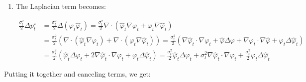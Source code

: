 \documentclass{article}
\begin{document}
\begin{enumerate}
\begin{small}
\begin{align}
    \end{align}
    \end{small}
    \item The Laplacian term becomes:
    \begin{small}
    \begin{align}
        \frac{\sigma_t^2}{2} \Delta p_t^\star&=\frac{\sigma_t^2}{2} \Delta (\varphi_t\hat{\varphi}_t)=\frac{\sigma_t^2}{2}\nabla\cdot (\hat{\varphi}_t\nabla \varphi_t+\varphi_t\nabla \hat{\varphi}_t)\nonumber\\
        &=\frac{\sigma_t^2}{2}(\nabla \cdot (\hat{\varphi}_t\nabla \varphi_t)+\nabla\cdot(\varphi_t\nabla \hat{\varphi}_t))=\frac{\sigma_t^2}{2}(\nabla \hat{\varphi}_t\cdot \nabla \varphi_t+\hat{\varphi}\Delta\varphi+\nabla \varphi_t\cdot\nabla \hat{\varphi}+\varphi_t\Delta\hat{\varphi}_t)\nonumber\\
        &=\frac{\sigma_t^2}{2} (\hat{\varphi}_t\Delta\varphi_t+2\nabla \hat{\varphi}_t\cdot \nabla \varphi_t+\varphi_t\Delta\hat{\varphi}_t)=\frac{\sigma_t^2}{2} \hat{\varphi}_t\Delta\varphi_t+\sigma_t^2\nabla \hat{\varphi}_t\cdot \nabla \varphi_t+\frac{\sigma_t^2}{2}\varphi_t\Delta\hat{\varphi}_t\label{eq:hopf-cole-proof3}
    \end{align}
    \end{small}
\end{enumerate}
Putting it together and canceling terms, we get:
\end{document}
